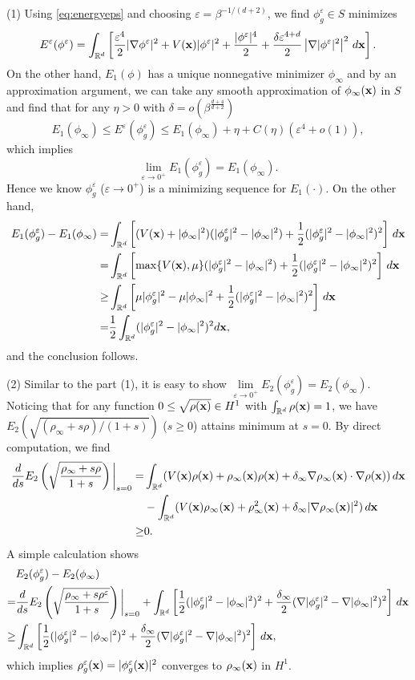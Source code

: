 \documentclass{elsarticle}
\newcommand{\vep}{\varepsilon}
\newcommand{\be}{\begin{equation}}
\newcommand{\ee}{\end{equation}}
\newcommand{\bx}{{\bf x} }
\begin{document}
 (1) Using \eqref{eq:energyeps} and choosing $\vep=\beta^{-1/(d+2)}$, we find  $\phi_g^\vep\in S$ minimizes
\be
E^\vep(\phi^\vep)=\int_{\Bbb R^d}\left[\frac{\vep^4}{2}|\nabla\phi^\vep|^2+V(\bx)|\phi^\vep|^2+\frac{|\phi^\vep|^4}{2}
+\frac{\delta\vep^{4+d}}{2}\left|\nabla|\phi^\vep|^2\right|^2\,d\bx\right].
\ee
On the other hand, $E_1(\phi)$ has a unique nonnegative minimizer $\phi_\infty$ and by an approximation argument, we can take any smooth approximation of $\phi_\infty(\bx)$ in $S$ and find that for any $\eta>0$ with  $\delta=o(\beta^{\frac{d+4}{d+2}})$
\begin{equation*}
E_1(\phi_\infty)\leq  E^{\vep}(\phi_g^\vep) \leq E_1(\phi_\infty)+\eta+C(\eta)(\vep^{4}+o(1)),
\end{equation*}
which implies
\be
\lim_{\vep\to0^+}E_1(\phi^\vep_g)=E_1(\phi_\infty).
\ee
Hence we know $\phi^\vep_g$ ($\vep\to0^+$) is  a minimizing sequence for $E_1(\cdot)$. On the other hand,
\begin{align*}
E_1(\phi^\vep_g)-E_1(\phi_\infty)=&\int_{\Bbb R^d}\left[(V(\bx)+|\phi_\infty|^2)(|\phi_g^\vep|^2-|\phi_\infty|^2) +\frac{1}{2}(|\phi_g^\vep|^2-|\phi_\infty|^2)^2\right]\,d\bx\\
=&\int_{\Bbb R^d}\left[\max\{V(\bx),\mu\}(|\phi_g^\vep|^2-|\phi_\infty|^2) +\frac{1}{2}(|\phi_g^\vep|^2-|\phi_\infty|^2)^2\right]\,d\bx\\
\ge&\int_{\Bbb R^d}\left[\mu|\phi_g^\vep|^2-\mu|\phi_\infty|^2 +\frac{1}{2}(|\phi_g^\vep|^2-|\phi_\infty|^2)^2\right]\,d\bx\\
=&\frac{1}{2}\int_{\Bbb R^d}(|\phi_g^\vep|^2-|\phi_\infty|^2)^2d\bx,
\end{align*}
and the conclusion follows.

(2)
Similar to the part (1),  it is easy to show $\lim\limits_{\vep\to0^+}E_2(\phi^\vep_g)=E_2(\phi_\infty)$.
Noticing that  for any function $0\leq \sqrt{\rho(\bx)}\in H^1$ with $\int_{\Bbb R^d}\rho(\bx)=1$, we have $E_2(\sqrt{(\rho_\infty+s\rho)/(1+s)})$ ($s\ge0$) attains
minimum at $s=0$.
By direct computation, we find
\begin{align*}
\frac{d}{ds}E_2\left(\sqrt{\frac{\rho_\infty+s\rho}{1+s}}\right)\bigg|_{s=0}=&\int_{\Bbb R^d} (V(\bx)\rho(\bx)+\rho_\infty(\bx)\rho(\bx)+\delta_\infty \nabla\rho_\infty(\bx)\cdot\nabla\rho(\bx))\,d\bx\\
&-\int_{\Bbb R^d} (V(\bx)\rho_\infty(\bx)+\rho^2_\infty(\bx)+\delta_\infty |\nabla\rho_\infty(\bx)|^2)\,d\bx\\
\ge&0.
\end{align*}
A simple calculation shows
\begin{align*}
&E_2(\phi^\vep_g)-E_2(\phi_\infty)\\
=&\frac{d}{ds}E_2\left(\sqrt{\frac{\rho_\infty+s\rho^\vep}{1+s}}\right)\bigg|_{s=0}+\int_{\Bbb R^d}\left[\frac{1}{2}(|\phi_g^\vep|^2-|\phi_\infty|^2)^2
+\frac{\delta_\infty}{2}(\nabla|\phi_g^\vep|^2-\nabla|\phi_\infty|^2)^2\right]\,d\bx\\
\ge&\int_{\Bbb R^d}\left[\frac{1}{2}(|\phi_g^\vep|^2-|\phi_\infty|^2)^2
+\frac{\delta_\infty}{2}(\nabla|\phi_g^\vep|^2-\nabla|\phi_\infty|^2)^2\right]\,d\bx,
\end{align*}
which implies $\rho_g^\vep(\bx)=|\phi_g^\vep(\bx)|^2$ converges to $\rho_\infty(\bx)$ in $H^1$.
\end{document}
